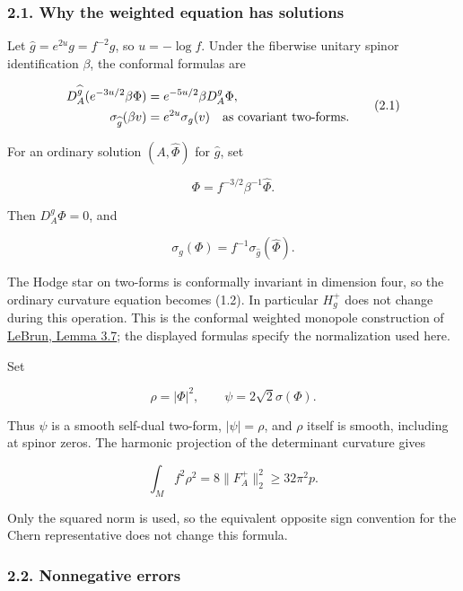 \documentclass[
  11pt,
]{article}
\begin{document}
\hypertarget{why-the-weighted-equation-has-solutions}{%
\subsubsection{2.1. Why the weighted equation has
solutions}\label{why-the-weighted-equation-has-solutions}}

Let \(\widehat g=e^{2u}g=f^{-2}g\), so \(u=-\log f\). Under the
fiberwise unitary spinor identification \(\beta\), the conformal
formulas are

\[
 \begin{split}
 D_A^{\widehat g}(e^{-3u/2}\beta\Phi)
        &=e^{-5u/2}\beta D_A^g\Phi,\\
 \sigma_{\widehat g}(\beta v)&=e^{2u}\sigma_g(v)
                   \quad\hbox{as covariant two-forms}.
 \end{split}                                              \tag{2.1}
\]

For an ordinary solution \((A,\widehat\Phi)\) for \(\widehat g\), set

\[
                 \Phi=f^{-3/2}\beta^{-1}\widehat\Phi.
\]

Then \(D_A^g\Phi=0\), and

\[
 \sigma_g(\Phi)=f^{-1}\sigma_{\widehat g}(\widehat\Phi).
\]

The Hodge star on two-forms is conformally invariant in dimension four,
so the ordinary curvature equation becomes (1.2). In particular
\(H_g^+\) does not change during this operation. This is the conformal
weighted monopole construction of
\href{https://arxiv.org/pdf/math/0611450}{LeBrun, Lemma 3.7}; the
displayed formulas specify the normalization used here.

Set

\[
             \rho=|\Phi|^2,\qquad \psi=2\sqrt2\sigma(\Phi).
 \tag{2.2}
\]

Thus \(\psi\) is a smooth self-dual two-form, \(|\psi|=\rho\), and
\(\rho\) itself is smooth, including at spinor zeros. The harmonic
projection of the determinant curvature gives

\[
 \int_M f^2\rho^2=8\|F_A^+\|_2^2\ge32\pi^2p.           \tag{2.3}
\]

Only the squared norm is used, so the equivalent opposite sign
convention for the Chern representative does not change this formula.

\hypertarget{nonnegative-errors}{%
\subsubsection{2.2. Nonnegative errors}\label{nonnegative-errors}}
\end{document}
